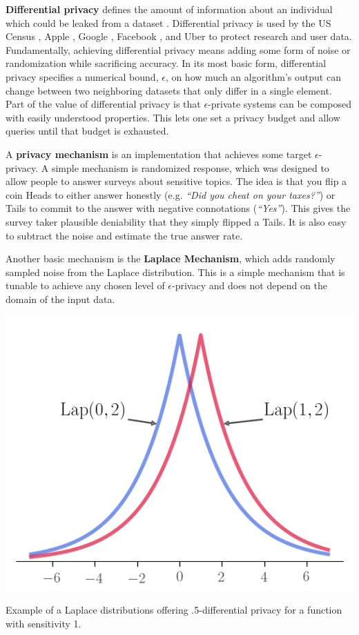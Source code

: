 \documentclass[nobib]{tufte-handout}
\begin{document}
\textbf{Differential privacy} defines the amount of information about an
individual which could be leaked from a dataset \cite{dwork2014algorithmic}.
Differential privacy is used by the US Census \cite{census-differential-privacy},
Apple \cite{apple-differential-privacy}, Google \cite{google-differential-privacy},
Facebook \cite{facebook-url-release}, and Uber \cite{uber-differential-privacy}
to protect research and user data. Fundamentally, achieving differential privacy
means adding some form of noise or randomization while sacrificing accuracy. In
its most basic form, differential privacy specifies a numerical bound,
$\epsilon$, on how much an algorithm’s output can change between two neighboring
datasets that only differ in a single element. Part of the value of differential
privacy is that $\epsilon$-private systems can be composed with easily
understood properties. This lets one set a privacy budget and allow queries
until that budget is exhausted.

A \textbf{privacy mechanism} is an implementation that achieves some target
$\epsilon$-privacy. A simple mechanism is randomized response, which was
designed to allow people to answer surveys about sensitive topics. The idea is
that you flip a coin Heads to either answer honestly (e.g. \textit{“Did you
cheat on your taxes?”}) or Tails to commit to the answer with negative
connotations (\textit{“Yes”}). This gives the survey taker plausible deniability
that they simply flipped a Tails. It is also easy to subtract the noise and
estimate the true answer rate.

Another basic mechanism is the \textbf{Laplace Mechanism}, which adds randomly
sampled noise from the Laplace distribution. This is a simple mechanism that is
tunable to achieve any chosen level of $\epsilon$-privacy and does not depend on
the domain of the input data.

\begin{marginfigure} \includegraphics[width=\linewidth]{laplace}
\caption{Example of a Laplace distributions offering .5-differential privacy for
a function with sensitivity 1.} \label{fig:laplace} \end{marginfigure}
\end{document}
